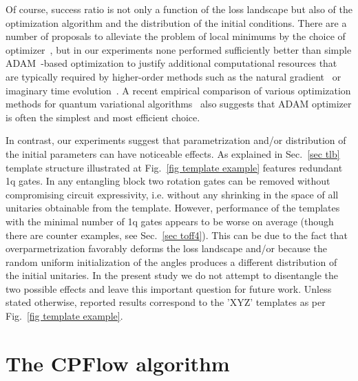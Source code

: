 \documentclass[twocolumn, amsfonts, amssymb, aps, nofootinbib]{revtex4-2}
\begin{document}
Of course, success ratio is not only a function of the loss landscape but also of the optimization algorithm and the distribution of the initial conditions. There are a number of proposals to alleviate the problem of local minimums by the choice of optimizer~\cite{Wierichs2020, Rivera-Dean2021}, but in our experiments none performed sufficiently better than simple ADAM~\cite{Kingma2015}-based optimization to justify additional computational resources that are typically required by higher-order methods such as the natural gradient~\cite{Stokes2020} or imaginary time evolution~\cite{Jones2018a}. A recent empirical comparison of various optimization methods for quantum variational algorithms~\cite{Lockwood2022} also suggests that ADAM optimizer is often the simplest and most efficient choice.

In contrast, our experiments suggest that parametrization and/or distribution of the initial parameters can have noticeable effects. As explained in Sec.~\ref{sec tlb} template structure illustrated at Fig.~\ref{fig template example} features redundant 1q gates. In any entangling block two rotation gates can be removed without compromising circuit expressivity, i.e. without any shrinking in the space of all unitaries obtainable from the template. However, performance of the templates with the minimal number of 1q gates appears to be worse on average (though there are counter examples, see Sec.~\ref{sec toff4}). This can be due to the fact that overparmetrization favorably deforms the loss landscape and/or because the random uniform initialization of the angles produces a different distribution of the initial unitaries. In the present study we do not attempt to disentangle the two possible effects and leave this important question for future work. Unless stated otherwise, reported results correspond to the 'XYZ' templates as per Fig.~\ref{fig template example}.


\section{The CPFlow algorithm \label{sec cpflow}}
\end{document}

